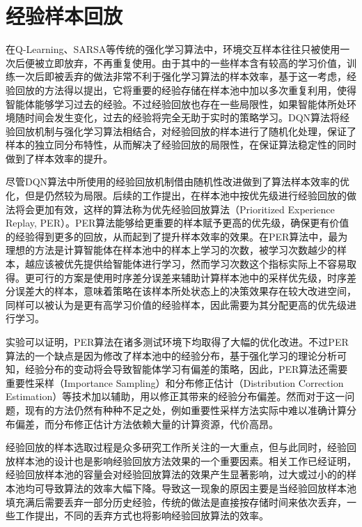 \section{经验样本回放}

在Q-Learning、SARSA\cite{watkins1992q,sutton2018reinforcement}等传统的强化学习算法中，环境交互样本往往只被使用一次后便被立即放弃，不再重复使用。由于其中的一些样本含有较高的学习价值，训练一次后即被丢弃的做法非常不利于强化学习算法的样本效率，基于这一考虑，经验回放的方法得以提出\cite{lin1992self}，它将重要的经验存储在样本池中加以多次重复利用，使得智能体能够学习过去的经验。不过经验回放也存在一些局限性，如果智能体所处环境随时间会发生变化，过去的经验将完全无助于实时的策略学习。DQN算法\cite{mnih2013playing}将经验回放机制与强化学习算法相结合，对经验回放的样本进行了随机化处理，保证了样本的独立同分布特性，从而解决了经验回放的局限性，在保证算法稳定性的同时做到了样本效率的提升。

尽管DQN算法中所使用的经验回放机制借由随机性改进做到了算法样本效率的优化，但是仍然较为局限。后续的工作提出，在样本池中按优先级进行经验回放的做法将会更加有效，这样的算法称为优先经验回放算法（Prioritized Experience Replay, PER）\cite{schaul2015prioritized}。PER算法能够给更重要的样本赋予更高的优先级，确保更有价值的经验得到更多的回放，从而起到了提升样本效率的效果。在PER算法中，最为理想的方法是计算智能体在样本池中的样本上学习的次数，被学习次数越少的样本，越应该被优先提供给智能体进行学习，然而学习次数这个指标实际上不容易取得。更可行的方案是使用时序差分误差来辅助计算样本池中的采样优先级，时序差分误差大的样本，意味着策略在该样本所处状态上的决策效果存在较大改进空间，同样可以被认为是更有高学习价值的经验样本\cite{tesauro1995temporal}，因此需要为其分配更高的优先级进行学习。

实验可以证明，PER算法在诸多测试环境下均取得了大幅的优化改进。不过PER算法的一个缺点是因为修改了样本池中的经验分布，基于强化学习的理论分析可知，经验分布的变动将会导致智能体学习有偏差的策略，因此，PER算法还需要重要性采样（Importance Sampling）\cite{tokdar2010importance}和分布修正估计（Distribution Correction Estimation）\cite{lee2021optidice}等技术加以辅助，用以修正其带来的经验分布偏差。然而对于这一问题，现有的方法仍然有种种不足之处，例如重要性采样方法实际中难以准确计算分布偏差，而分布修正估计方法依赖大量的计算资源，代价高昂。

经验回放的样本选取过程是众多研究工作所关注的一大重点，但与此同时，经验回放样本池的设计也是影响经验回放方法效果的一个重要因素。相关工作已经证明，经验回放样本池的容量会对经验回放算法的效果产生显著影响，过大或过小的的样本池均可导致算法的效率大幅下降\cite{zhang2017deeper}。导致这一现象的原因主要是当经验回放样本池填充满后需要丢弃一部分历史经验，传统的做法是直接按存储时间来依次丢弃，一些工作提出，不同的丢弃方式也将影响经验回放算法的效率\cite{pieters2016q}。

